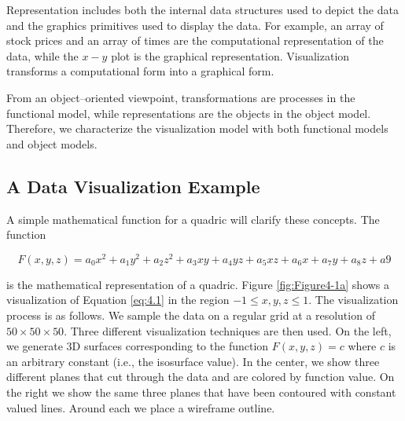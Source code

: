 Representation includes both the internal data structures used to depict the data and the graphics primitives used to display the data. For example, an array of stock prices and an array of times are the computational representation of the data, while the $x-y$ plot is the graphical representation. Visualization transforms a computational form into a graphical form.

From an object--oriented viewpoint, transformations are processes in the functional model, while representations are the objects in the object model. Therefore, we characterize the visualization model with both functional models and object models.

\subsection{A Data Visualization Example}
\label{subsec:data_visualization_example}

A simple mathematical function for a quadric will clarify these concepts. The function

\begin{equation}\label{eq:4.1}
F(x,y,z) = a_0x^2 + a_1y^2 + a_2z^2 + a_3xy + a_4yz + a_5xz + a_6x + a_7y + a_8z + a9
\end{equation}

is the mathematical representation of a quadric. Figure \ref{fig:Figure4-1a} shows a visualization of Equation \ref{eq:4.1} in the region $-1 \leqslant x, y, z \leqslant 1$. The visualization process is as follows. We sample the data on a regular grid at a resolution of $50 \times 50 \times 50$. Three
different visualization techniques are then used. On the left, we generate 3D surfaces corresponding to the function $F(x,y,z) = c$ where $c$ is an arbitrary constant (i.e., the isosurface value). In the center, we show three different planes that cut through the data and are colored by function value. On the right we show the same three planes that have been contoured with constant valued lines. Around each we place a wireframe outline.

